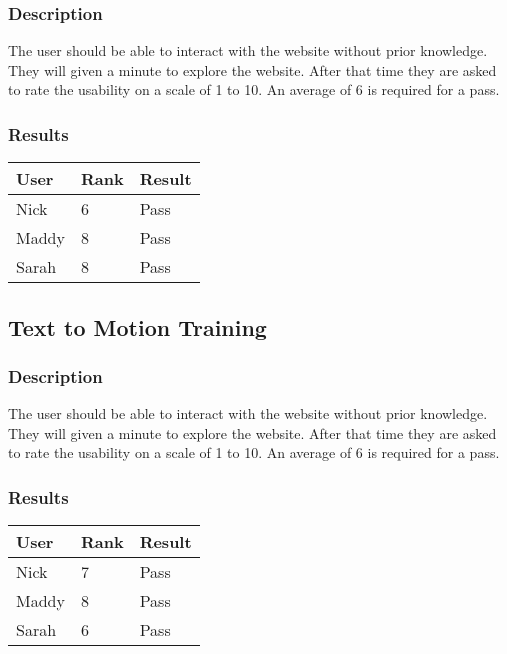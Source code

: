 \documentclass{scrreprt}
\begin{document}
\subsubsection{Description}
\begin{flushleft}
The user should be able to interact with the website without prior knowledge. They will given a minute to explore the website. After that time they are asked to rate the usability on a scale of 1 to 10. An average of 6 is required for a pass.
\subsubsection{Results}
\end{flushleft}

 \centering
 \begin{tabular}{||p{2.5cm}|p{2.5cm}|p{2.5cm}||}
 \hline
 \bf User & \bf Rank & \bf Result\\
 \hline\hline
 Nick & 6 & Pass \\
 \hline
 Maddy & 8 & Pass \\ 
 \hline
 Sarah & 8 & Pass\\
 \hline
 \end{tabular}

\subsection{Text to Motion Training }
\subsubsection{Description}
\begin{flushleft}
The user should be able to interact with the website without prior knowledge. They will given a minute to explore the website. After that time they are asked to rate the usability on a scale of 1 to 10. An average of 6 is required for a pass.
\subsubsection{Results}
\end{flushleft}

 \centering
 \begin{tabular}{||p{2.5cm}|p{2.5cm}|p{2.5cm}||}
 \hline
 \bf User & \bf Rank & \bf Result\\
 \hline\hline
 Nick & 7 & Pass \\
 \hline
 Maddy & 8 & Pass \\ 
 \hline
 Sarah & 6 & Pass\\
 \hline
 \end{tabular}
\end{document}
